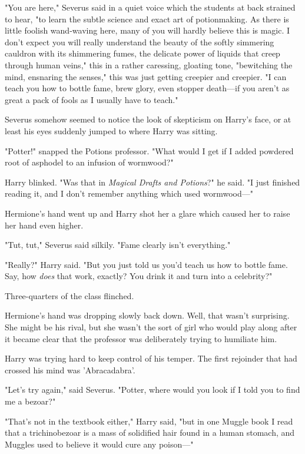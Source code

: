 "You are here," Severus said in a quiet voice which the students at back 
strained to hear, "to learn the subtle science and exact art of potionmaking. 
As there is little foolish wand-waving here, many of you will hardly believe 
this is magic. I don't expect you will really understand the beauty of the 
softly simmering cauldron with its shimmering fumes, the delicate power of 
liquids that creep through human veins," this in a rather caressing, gloating 
tone, "bewitching the mind, ensnaring the senses," this was just getting 
creepier and creepier. "I can teach you how to bottle fame, brew glory, even 
stopper death---if you aren't as great a pack of fools as I usually have to 
teach."

Severus somehow seemed to notice the look of skepticism on Harry's face, or at 
least his eyes suddenly jumped to where Harry was sitting.

"Potter!" snapped the Potions professor. "What would I get if I added powdered 
root of asphodel to an infusion of wormwood?"

Harry blinked. "Was that in \emph{Magical Drafts and Potions}?" he said. "I 
just finished reading it, and I don't remember anything which used wormwood---"

Hermione's hand went up and Harry shot her a glare which caused her to raise 
her hand even higher.

"Tut, tut," Severus said silkily. "Fame clearly isn't everything."

"Really?" Harry said. "But you just told us you'd teach us how to bottle fame. 
Say, how \emph{does} that work, exactly? You drink it and turn into a 
celebrity?"

Three-quarters of the class flinched.

Hermione's hand was dropping slowly back down. Well, that wasn't surprising. 
She might be his rival, but she wasn't the sort of girl who would play along 
after it became clear that the professor was deliberately trying to humiliate 
him.

Harry was trying hard to keep control of his temper. The first rejoinder that 
had crossed his mind was 'Abracadabra'.

"Let's try again," said Severus. "Potter, where would you look if I told you to 
find me a bezoar?"

"That's not in the textbook either," Harry said, "but in one Muggle book I read 
that a trichinobezoar is a mass of solidified hair found in a human stomach, 
and Muggles used to believe it would cure any poison---"

